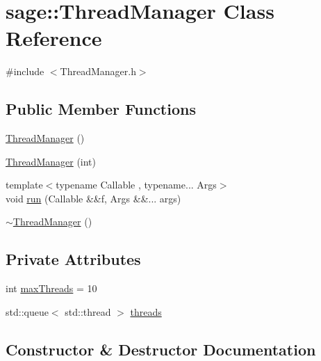 \hypertarget{classsage_1_1ThreadManager}{}\section{sage\+::Thread\+Manager Class Reference}
\label{classsage_1_1ThreadManager}


{\ttfamily \#include $<$Thread\+Manager.\+h$>$}

\subsection*{Public Member Functions}
\begin{DoxyCompactItemize}
\item 
\mbox{\hyperlink{classsage_1_1ThreadManager_a613b13ebf45502e4d86c2f9317ec5871}{Thread\+Manager}} ()
\item 
\mbox{\hyperlink{classsage_1_1ThreadManager_af7d592b11ce70f64729bc6be1a35f1de}{Thread\+Manager}} (int)
\item 
{\footnotesize template$<$typename Callable , typename... Args$>$ }\\void \mbox{\hyperlink{classsage_1_1ThreadManager_abb7e6b4a8ed44173eff9de2213f64236}{run}} (Callable \&\&f, Args \&\&... args)
\item 
\mbox{\hyperlink{classsage_1_1ThreadManager_a18eb12d3d752075318c3672c8efffd5b}{$\sim$\+Thread\+Manager}} ()
\end{DoxyCompactItemize}
\subsection*{Private Attributes}
\begin{DoxyCompactItemize}
\item 
int \mbox{\hyperlink{classsage_1_1ThreadManager_a683170f7241e11e86746d2a0aec413ed}{max\+Threads}} = 10
\item 
std\+::queue$<$ std\+::thread $>$ \mbox{\hyperlink{classsage_1_1ThreadManager_a998c3f4309c9eae2e7e69223b2d5de49}{threads}}
\end{DoxyCompactItemize}


\subsection{Constructor \& Destructor Documentation}
\mbox{\label{classsage_1_1ThreadManager_a613b13ebf45502e4d86c2f9317ec5871}} 
